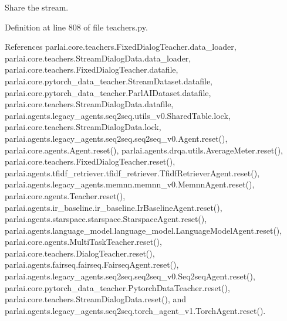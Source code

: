 \begin{DoxyVerb}Share the stream.\end{DoxyVerb}
 

Definition at line 808 of file teachers.\+py.



References parlai.\+core.\+teachers.\+Fixed\+Dialog\+Teacher.\+data\+\_\+loader, parlai.\+core.\+teachers.\+Stream\+Dialog\+Data.\+data\+\_\+loader, parlai.\+core.\+teachers.\+Fixed\+Dialog\+Teacher.\+datafile, parlai.\+core.\+pytorch\+\_\+data\+\_\+teacher.\+Stream\+Dataset.\+datafile, parlai.\+core.\+pytorch\+\_\+data\+\_\+teacher.\+Parl\+A\+I\+Dataset.\+datafile, parlai.\+core.\+teachers.\+Stream\+Dialog\+Data.\+datafile, parlai.\+agents.\+legacy\+\_\+agents.\+seq2seq.\+utils\+\_\+v0.\+Shared\+Table.\+lock, parlai.\+core.\+teachers.\+Stream\+Dialog\+Data.\+lock, parlai.\+agents.\+legacy\+\_\+agents.\+seq2seq.\+seq2seq\+\_\+v0.\+Agent.\+reset(), parlai.\+core.\+agents.\+Agent.\+reset(), parlai.\+agents.\+drqa.\+utils.\+Average\+Meter.\+reset(), parlai.\+core.\+teachers.\+Fixed\+Dialog\+Teacher.\+reset(), parlai.\+agents.\+tfidf\+\_\+retriever.\+tfidf\+\_\+retriever.\+Tfidf\+Retriever\+Agent.\+reset(), parlai.\+agents.\+legacy\+\_\+agents.\+memnn.\+memnn\+\_\+v0.\+Memnn\+Agent.\+reset(), parlai.\+core.\+agents.\+Teacher.\+reset(), parlai.\+agents.\+ir\+\_\+baseline.\+ir\+\_\+baseline.\+Ir\+Baseline\+Agent.\+reset(), parlai.\+agents.\+starspace.\+starspace.\+Starspace\+Agent.\+reset(), parlai.\+agents.\+language\+\_\+model.\+language\+\_\+model.\+Language\+Model\+Agent.\+reset(), parlai.\+core.\+agents.\+Multi\+Task\+Teacher.\+reset(), parlai.\+core.\+teachers.\+Dialog\+Teacher.\+reset(), parlai.\+agents.\+fairseq.\+fairseq.\+Fairseq\+Agent.\+reset(), parlai.\+agents.\+legacy\+\_\+agents.\+seq2seq.\+seq2seq\+\_\+v0.\+Seq2seq\+Agent.\+reset(), parlai.\+core.\+pytorch\+\_\+data\+\_\+teacher.\+Pytorch\+Data\+Teacher.\+reset(), parlai.\+core.\+teachers.\+Stream\+Dialog\+Data.\+reset(), and parlai.\+agents.\+legacy\+\_\+agents.\+seq2seq.\+torch\+\_\+agent\+\_\+v1.\+Torch\+Agent.\+reset().

